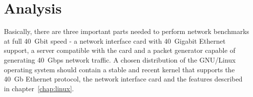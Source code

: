 
\chapter{Analysis}\label{chap:analysis}
Basically, there are three important parts needed to perform network benchmarks at full 40~Gbit speed -
a network interface card with 40~Gigabit Ethernet support, a server compatible with the card and a packet generator
capable of generating 40~Gbps network traffic.
A chosen distribution of the GNU/Linux operating system should contain a stable and
recent kernel that supports the 40~Gb Ethernet protocol, the network interface card
and the features described in chapter~\ref{chap:linux}.








